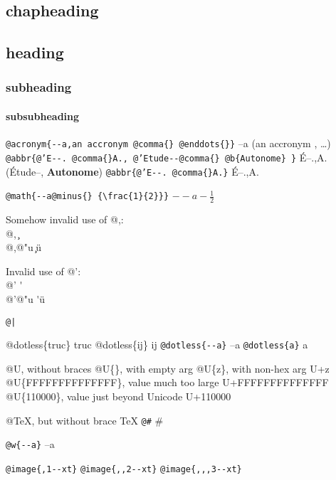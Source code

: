 \documentclass{book}
\newcommand{\GNUTexinfoplaceholder}[1]{}
\newcommand{\GNUTexinfonopagebreakheading}[2]{{\let\clearpage\relax \let\cleardoublepage\relax \let\thispagestyle\GNUTexinfoplaceholder #1{#2}}}
\begin{document}
\begin{titlepage}
\GNUTexinfonopagebreakheading{\chapter*}{{chapheading}}

\GNUTexinfonopagebreakheading{\section*}{{heading}}

\GNUTexinfonopagebreakheading{\subsection*}{{subheading}}

\GNUTexinfonopagebreakheading{\subsubsection*}{{subsubheading}}


\texttt{@acronym\{{-}{-}a,an accronym @comma\{\}\ @enddots\{\}\}} --a (an accronym , \dots{})
\texttt{@abbr\{@'E{-}{-}.\ @comma\{\}A.,\ @'Etude{-}{-}@comma\{\}\ @b\{Autonome\}\ \}} \'{E}--.\@ ,A.\@ (\'{E}tude--, \textbf{Autonome})
\texttt{@abbr\{@'E{-}{-}.\ @comma\{\}A.\}} \'{E}--.\@ ,A.\@

\texttt{@math\{{-}{-}a@minus\{\}\ \{\textbackslash{}frac\{1\}\{2\}\}\}} $--a- {\frac{1}{2}}$




Somehow invalid use of @,:\leavevmode{}\\
@, \c{}\leavevmode{}\\
@,@"u \c{}\"{u}

Invalid use of @':\leavevmode{}\\
@' \'{}\leavevmode{}\\
@'@"u \'{}\"{u}

\texttt{@|} 

@dotless\{truc\} truc
@dotless\{ij\} ij
\texttt{@dotless\{{-}{-}a\}} --a
\texttt{@dotless\{a\}} a

@U, without braces @U\{\}, with empty arg 
@U\{z\}, with non-hex arg U+z
@U\{FFFFFFFFFFFFFF\}, value much too large U+FFFFFFFFFFFFFF
@U\{110000\}, value just beyond Unicode U+110000

@TeX, but without brace \TeX{}
\texttt{@\#} \#

\texttt{@w\{{-}{-}a\}} \hbox{--a}

\texttt{@image\{,1{-}{-}xt\}} 
\texttt{@image\{{,}{,}2{-}{-}xt\}} 
\texttt{@image\{{,}{,},3{-}{-}xt\}} 


\end{titlepage}
\end{document}
